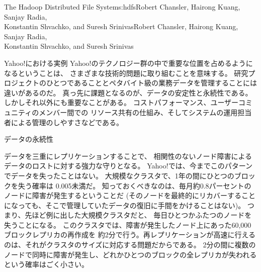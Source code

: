 \begin{aosachaptertoc}{The Hadoop Distributed File System}{s:hdfs}{Robert Chansler, Hairong Kuang, Sanjay Radia, \\ Konstantin Shvachko, and Suresh Srinivas}{Robert Chansler, Hairong Kuang, Sanjay Radia, \\ \hspace*{0.9cm} Konstantin Shvachko, and Suresh Srinivas}
\begin{aosasect1}{Yahoo!における実例}
Yahoo!のテクノロジー群の中で重要な位置を占めるようになるということは、
さまざまな技術的問題に取り組むことを意味する。
研究プロジェクトのひとつであることとペタバイト級の業務データを管理することには違いがあるのだ。
真っ先に課題となるのが、データの安定性と永続性である。
しかしそれ以外にも重要なことがある。
コストパフォーマンス、ユーザーコミュニティのメンバー間での
リソース共有の仕組み、そしてシステムの運用担当者による管理のしやすさなどである。

\begin{aosasect2}{データの永続性}

データを三重にレプリケーションすることで、
相関性のないノード障害によるデータのロストに対する強力な守りとなる。
Yahoo!では、今までこのパターンでデータを失ったことはない。
大規模なクラスタで、1年の間にひとつのブロックを失う確率は
0.005未満だ。
知っておくべきなのは、毎月約0.8パーセントのノードに障害が発生するということだ
(そのノードを最終的にリカバーすることになっても、そこで管理していたデータの復旧に手間をかけることはない)。
つまり、先ほど例に出した大規模クラスタだと、
毎日ひとつかふたつのノードを失うことになる。
このクラスタでは、障害が発生したノード上にあった60,000ブロックレプリカの再作成を
約2分で行う。再レプリケーションが高速に行えるのは、それがクラスタのサイズに対応する問題だからである。
2分の間に複数のノードで同時に障害が発生し、どれかひとつのブロックの全レプリカが失われる
という確率はごく小さい。


\end{aosasect2}
\end{aosasect1}
\end{aosachaptertoc}
